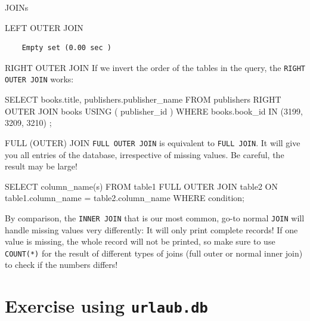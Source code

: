 \begin{frame}{JOINs}
\begin{block}{LEFT OUTER JOIN}
\begin{verbatim}
    Empty set (0.00 sec )
\end{verbatim}
\end{block}

\framebreak 

\begin{block}{RIGHT OUTER JOIN}\small
If we invert the order of the tables in the query, the \texttt{RIGHT OUTER JOIN} works:
\begin{sqlcode}
SELECT books.title, publishers.publisher_name
FROM publishers
RIGHT OUTER JOIN books USING ( publisher_id )
WHERE books.book_id IN (3199, 3209, 3210) ;
\end{sqlcode}
\end{block}

\framebreak

\begin{block}{FULL (OUTER) JOIN}\small
\texttt{FULL OUTER JOIN} is equivalent to \texttt{FULL JOIN}. It will give you all entries of the database, irrespective of missing values. Be careful, the result may be large! 
\begin{sqlcode}
SELECT column_name(s)
FROM table1
FULL OUTER JOIN table2
ON table1.column_name = table2.column_name
WHERE condition;
\end{sqlcode}
\end{block}

By comparison, the \texttt{INNER JOIN} that is our most common, go-to normal \texttt{JOIN} will handle missing values very differently: It will only print complete records! If one value is missing, the whole record will not be printed, so make sure to use \texttt{COUNT(*)} for the result of different types of joins (full outer or normal inner join) to check if the numbers differs!

\end{frame}

 

\section{Exercise using \texttt{urlaub.db}}

